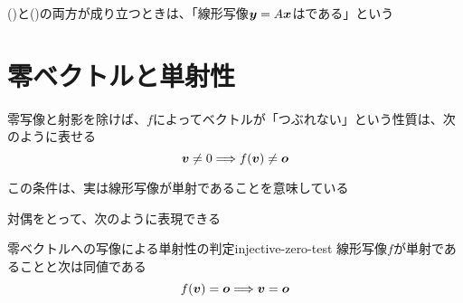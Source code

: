 \documentclass[../../../topic_linear-algebra]{subfiles}
\begin{document}
()と()の両方が成り立つときは、「線形写像$\vb*{y} = A\vb*{x}$はである」という

\sectionline
\section{零ベクトルと単射性}\label{sec:zero-vector-and-injectivity}

零写像と射影を除けば、$f$によってベクトルが「つぶれない」という性質は、次のように表せる
\begin{equation*}
  \vb*{v} \neq 0 \Longrightarrow f(\vb*{v}) \neq \vb*{o}
\end{equation*}


この条件は、実は線形写像が単射であることを意味している

対偶をとって、次のように表現できる

\begin{theorem}{零ベクトルへの写像による単射性の判定}{injective-zero-test}
  線形写像$f$が単射であることと次は同値である
  \begin{equation*}
    f(\vb*{v}) = \vb*{o} \Longrightarrow \vb*{v} = \vb*{o}
  \end{equation*}
\end{theorem}
\end{document}
